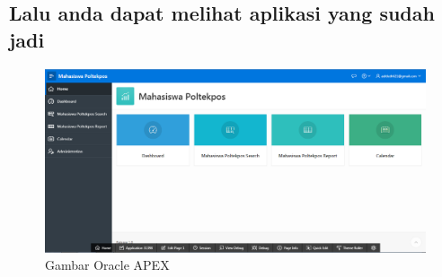 \documentclass[12pt, times new roman, a4paper]{article}
\begin{document}
\subsection{Lalu anda dapat melihat aplikasi yang sudah jadi}
\begin{figure}[h]
	\centering
		\includegraphics[scale=0.3]{gambar/12}
	\caption{Gambar Oracle APEX}
\end{figure}
\end{document}
